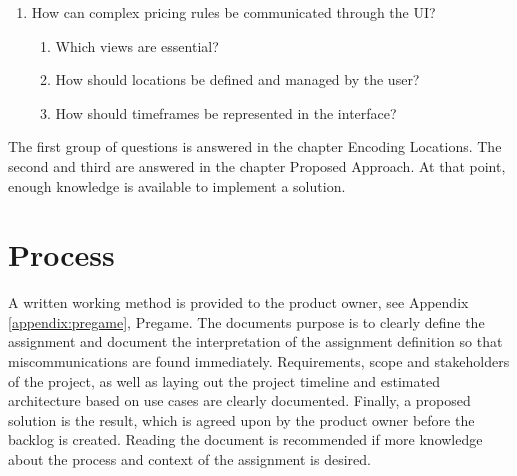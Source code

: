 \begin{enumerate}
	\item How can complex pricing rules be communicated through the UI?
		\begin{enumerate}[label*=\arabic*.]

			\item Which views are essential?
			\item How should locations be defined and managed by the user?
			\item How should timeframes be represented in the interface?
		\end{enumerate}

\end{enumerate}

The first group of questions is answered in the chapter Encoding Locations. The second and third are answered in the chapter Proposed Approach. At that point, enough knowledge is available to implement a solution.

%
\section{Process}

A written working method is provided to the product owner, see Appendix \ref{appendix:pregame}, Pregame. The documents purpose is to clearly define the assignment and document the interpretation of the assignment definition so that miscommunications are found immediately. Requirements, scope and stakeholders of the project, as well as laying out the project timeline and estimated architecture based on use cases are clearly documented. Finally, a proposed solution is the result, which is agreed upon by the product owner before the backlog is created. Reading the document is recommended if more knowledge about the process and context of the assignment is desired.
